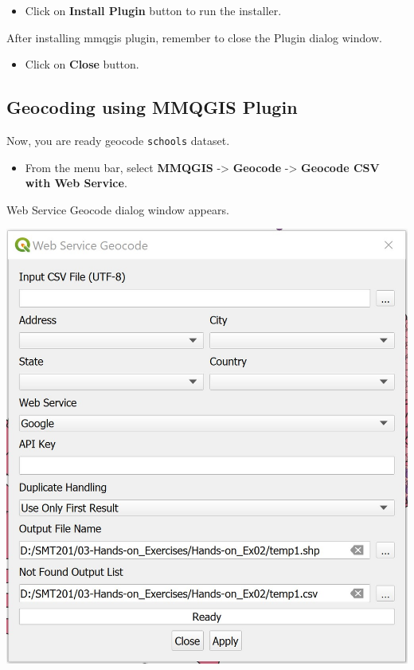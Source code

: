 \documentclass[
  letterpaper,
  DIV=11,
  numbers=noendperiod]{scrreprt}
\providecommand{\tightlist}{%
  \setlength{\itemsep}{0pt}\setlength{\parskip}{0pt}}\usepackage{longtable,booktabs,array}
\begin{document}
\begin{itemize}
\tightlist
\item
  Click on \textbf{Install Plugin} button to run the installer.
\end{itemize}

After installing mmqgis plugin, remember to close the Plugin dialog
window.

\begin{itemize}
\tightlist
\item
  Click on \textbf{Close} button.
\end{itemize}

\hypertarget{geocoding-using-mmqgis-plugin}{%
\subsection{Geocoding using MMQGIS
Plugin}\label{geocoding-using-mmqgis-plugin}}

Now, you are ready geocode \texttt{schools} dataset.

\begin{itemize}
\tightlist
\item
  From the menu bar, select \textbf{MMQGIS} -\textgreater{}
  \textbf{Geocode} -\textgreater{} \textbf{Geocode CSV with Web
  Service}.
\end{itemize}

Web Service Geocode dialog window appears.

\includegraphics{./img02/image20.jpg}
\end{document}
